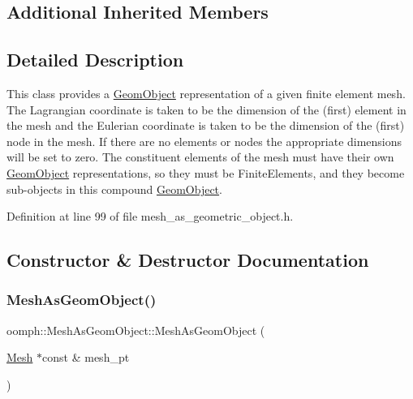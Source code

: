 \subsection*{Additional Inherited Members}


\subsection{Detailed Description}
This class provides a \hyperlink{classoomph_1_1GeomObject}{Geom\+Object} representation of a given finite element mesh. The Lagrangian coordinate is taken to be the dimension of the (first) element in the mesh and the Eulerian coordinate is taken to be the dimension of the (first) node in the mesh. If there are no elements or nodes the appropriate dimensions will be set to zero. The constituent elements of the mesh must have their own \hyperlink{classoomph_1_1GeomObject}{Geom\+Object} representations, so they must be Finite\+Elements, and they become sub-\/objects in this compound \hyperlink{classoomph_1_1GeomObject}{Geom\+Object}. 

Definition at line 99 of file mesh\+\_\+as\+\_\+geometric\+\_\+object.\+h.



\subsection{Constructor \& Destructor Documentation}
\mbox{\label{classoomph_1_1MeshAsGeomObject_a7d232452ef38433a589d030cc8bb4f06}} 
\subsubsection{\texorpdfstring{Mesh\+As\+Geom\+Object()}{MeshAsGeomObject()}\hspace{0.1cm}{\footnotesize\ttfamily [1/4]}}
{\footnotesize\ttfamily oomph\+::\+Mesh\+As\+Geom\+Object\+::\+Mesh\+As\+Geom\+Object (\begin{DoxyParamCaption}\item[{\hyperlink{classoomph_1_1Mesh}{Mesh} $\ast$const \&}]{mesh\+\_\+pt }\end{DoxyParamCaption})\hspace{0.3cm}{\ttfamily [inline]}}



